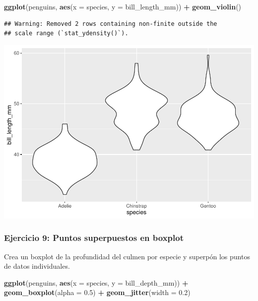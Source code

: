 \documentclass[
]{book}
\newenvironment{Shaded}{\begin{snugshade}}{\end{snugshade}}
\newcommand{\AttributeTok}[1]{\textcolor[rgb]{0.13,0.29,0.53}{#1}}
\newcommand{\FloatTok}[1]{\textcolor[rgb]{0.00,0.00,0.81}{#1}}
\newcommand{\FunctionTok}[1]{\textcolor[rgb]{0.13,0.29,0.53}{\textbf{#1}}}
\newcommand{\NormalTok}[1]{#1}
\newcommand{\SpecialCharTok}[1]{\textcolor[rgb]{0.81,0.36,0.00}{\textbf{#1}}}
\begin{document}
\begin{Shaded}
\begin{Highlighting}[]
\FunctionTok{ggplot}\NormalTok{(penguins, }\FunctionTok{aes}\NormalTok{(}\AttributeTok{x =}\NormalTok{ species, }\AttributeTok{y =}\NormalTok{ bill\_length\_mm)) }\SpecialCharTok{+}
  \FunctionTok{geom\_violin}\NormalTok{()}
\end{Highlighting}
\end{Shaded}

\begin{verbatim}
## Warning: Removed 2 rows containing non-finite outside the
## scale range (`stat_ydensity()`).
\end{verbatim}

\includegraphics{bookdown-demo_files/figure-latex/unnamed-chunk-190-1.pdf}

\subsubsection{Ejercicio 9: Puntos superpuestos en boxplot}\label{ejercicio-9-puntos-superpuestos-en-boxplot}

Crea un boxplot de la profundidad del culmen por especie y superpón los puntos de datos individuales.

\begin{Shaded}
\begin{Highlighting}[]
\FunctionTok{ggplot}\NormalTok{(penguins, }\FunctionTok{aes}\NormalTok{(}\AttributeTok{x =}\NormalTok{ species, }\AttributeTok{y =}\NormalTok{ bill\_depth\_mm)) }\SpecialCharTok{+}
  \FunctionTok{geom\_boxplot}\NormalTok{(}\AttributeTok{alpha =} \FloatTok{0.5}\NormalTok{) }\SpecialCharTok{+}
  \FunctionTok{geom\_jitter}\NormalTok{(}\AttributeTok{width =} \FloatTok{0.2}\NormalTok{)}
\end{Highlighting}
\end{Shaded}
\end{document}
